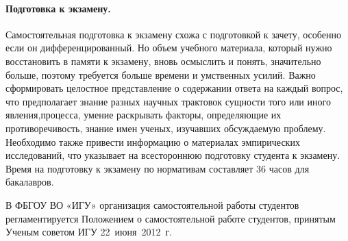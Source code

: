 {\paragraph{Подготовка к экзамену.} Самостоятельная подготовка к экзамену схожа с
подготовкой к зачету, особенно если он дифференцированный. Но объем учебного
материала, который нужно восстановить в памяти к экзамену, вновь осмыслить и понять,
значительно больше, поэтому требуется больше времени и умственных усилий. Важно
сформировать целостное представление о содержании ответа на каждый вопрос, что
предполагает знание разных научных трактовок сущности того или иного явления,процесса, умение раскрывать факторы, определяющие их противоречивость, знание имен
ученых, изучавших обсуждаемую проблему. Необходимо также привести информацию о
материалах эмпирических исследований, что указывает на всестороннюю подготовку
студента к экзамену. Время на подготовку к экзамену по нормативам составляет 36 часов
для бакалавров.\par
В ФБГОУ ВО «ИГУ» организация самостоятельной работы студентов
регламентируется Положением о самостоятельной работе студентов, принятым Ученым
советом ИГУ 22~июня~2012~г.
}


\makeatother
